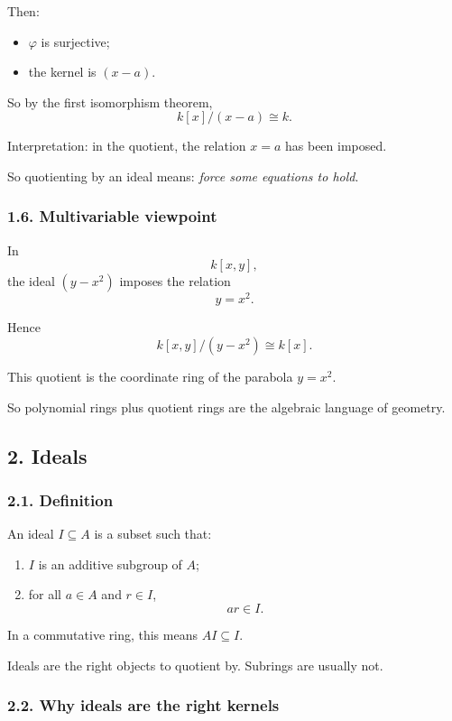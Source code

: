 \documentclass[12pt,a4paper]{article}
\theoremstyle{plain}
\theoremstyle{definition}      %
\begin{document}
	Then:
	\begin{itemize}
		\item \(\varphi\) is surjective;
		\item the kernel is \((x-a)\).
	\end{itemize}
	
	So by the first isomorphism theorem,
	\[
	k[x]/(x-a)\cong k.
	\]
	
	Interpretation: in the quotient, the relation \(x=a\) has been imposed.
	
	So quotienting by an ideal means: \emph{force some equations to hold}.
	
	\subsubsection*{1.6. Multivariable viewpoint}
	
	In
	\[
	k[x,y],
	\]
	the ideal \((y-x^2)\) imposes the relation
	\[
	y=x^2.
	\]
	
	Hence
	\[
	k[x,y]/(y-x^2)\cong k[x].
	\]
	
	This quotient is the coordinate ring of the parabola \(y=x^2\).
	
	So polynomial rings plus quotient rings are the algebraic language of geometry.
	
	\subsection*{2. Ideals}
	
	\subsubsection*{2.1. Definition}
	
	An ideal \(I\subseteq A\) is a subset such that:
	\begin{enumerate}
		\item \(I\) is an additive subgroup of \(A\);
		\item for all \(a\in A\) and \(r\in I\),
		\[
		ar\in I.
		\]
	\end{enumerate}
	
	In a commutative ring, this means \(AI\subseteq I\).
	
	Ideals are the right objects to quotient by.
	Subrings are usually not.
	
	\subsubsection*{2.2. Why ideals are the right kernels}
	
\end{document}
